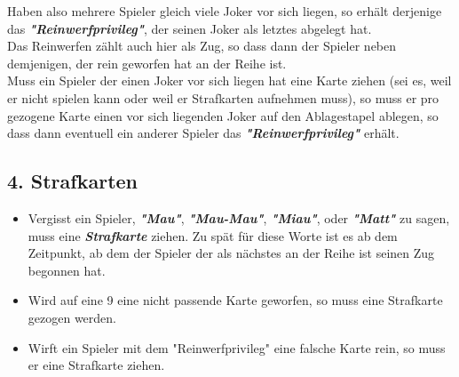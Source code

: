 \documentclass{article}
\begin{document}
\begin{itemize}
Haben also mehrere Spieler gleich viele Joker vor sich liegen, so erhält derjenige das \textit{\textbf{"Reinwerfprivileg"}}, der seinen Joker als letztes abgelegt hat.  \\
Das Reinwerfen zählt auch hier als Zug, so dass dann der Spieler neben demjenigen, der rein geworfen hat an der Reihe ist. \\
Muss ein Spieler der einen Joker vor sich liegen hat eine Karte ziehen (sei es, weil er nicht spielen kann oder weil er Strafkarten aufnehmen muss), so muss er pro gezogene Karte einen vor sich liegenden Joker auf den Ablagestapel ablegen, so dass dann eventuell ein anderer Spieler das \textit{\textbf{"Reinwerfprivileg"}} erhält.
\end{itemize}
\subsection*{4. Strafkarten}
\begin{itemize}
\item Vergisst ein Spieler, \textit{\textbf{"Mau"}}, \textit{\textbf{"Mau-Mau"}}, \textit{\textbf{"Miau"}}, oder 
\textit{\textbf{"Matt"}} zu sagen, muss eine \textit{\textbf{Strafkarte}} ziehen. Zu spät für diese Worte ist es ab dem Zeitpunkt, ab dem der Spieler der als nächstes an der Reihe ist seinen Zug begonnen hat.


\item Wird auf eine 9 eine nicht passende Karte geworfen, so muss eine Strafkarte gezogen werden.

\item Wirft ein Spieler mit dem "Reinwerfprivileg" eine falsche Karte rein, so muss er eine Strafkarte ziehen.
\end{itemize}         
\end{document}
